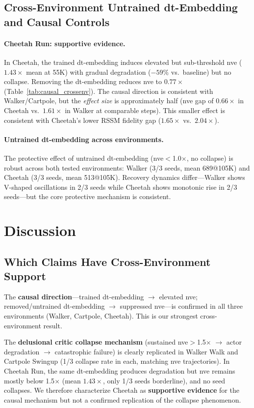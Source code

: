 \documentclass[letterpaper]{article}
\begin{document}
\subsection{Cross-Environment Untrained dt-Embedding and Causal Controls}
\label{sec:results_crossenv_supp}

\paragraph{Cheetah Run: supportive evidence.}
In Cheetah, the trained dt-embedding induces elevated but sub-threshold nve ($1.43\times$ mean at 55K) with gradual degradation ($-59\%$ vs.\ baseline) but no collapse.
Removing the dt-embedding reduces nve to $0.77\times$ (Table~\ref{tab:causal_crossenv}).
The causal direction is consistent with Walker/Cartpole, but the \emph{effect size} is approximately half (nve gap of $0.66\times$ in Cheetah vs.\ $1.61\times$ in Walker at comparable steps).
This smaller effect is consistent with Cheetah's lower RSSM fidelity gap ($1.65\times$ vs.\ $2.04\times$).

\paragraph{Untrained dt-embedding across environments.}
The protective effect of untrained dt-embedding (nve$<$1.0$\times$, no collapse) is robust across both tested environments: Walker (3/3 seeds, mean 689@105K) and Cheetah (3/3 seeds, mean 513@105K).
Recovery dynamics differ---Walker shows V-shaped oscillations in 2/3 seeds while Cheetah shows monotonic rise in 2/3 seeds---but the core protective mechanism is consistent.

\section{Discussion}
\label{sec:discussion}

\subsection{Which Claims Have Cross-Environment Support}

The \textbf{causal direction}---trained dt-embedding $\to$ elevated nve; removed/untrained dt-embedding $\to$ suppressed nve---is confirmed in all three environments (Walker, Cartpole, Cheetah).
This is our strongest cross-environment result.

The \textbf{delusional critic collapse mechanism} (sustained nve$>$1.5$\times$ $\to$ actor degradation $\to$ catastrophic failure) is clearly replicated in Walker Walk and Cartpole Swingup (1/3 collapse rate in each, matching nve trajectories).
In Cheetah Run, the same dt-embedding produces degradation but nve remains mostly below 1.5$\times$ (mean $1.43\times$, only 1/3 seeds borderline), and no seed collapses.
We therefore characterize Cheetah as \textbf{supportive evidence} for the causal mechanism but not a confirmed replication of the collapse phenomenon.
\end{document}
